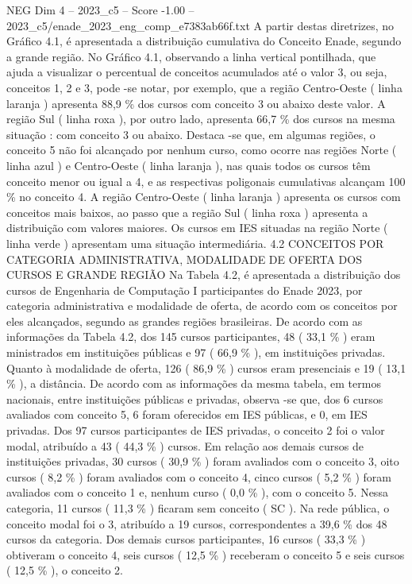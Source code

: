 \begin{textsample}{NEG Dim 4 – 2023\_c5 – Score -1.00 – 2023\_c5/enade\_2023\_eng\_comp\_e7383ab66f.txt}
A partir destas diretrizes, no Gráfico 4.1, é apresentada a distribuição cumulativa do Conceito Enade, segundo a grande região.
No Gráfico 4.1, observando a linha vertical pontilhada, que ajuda a visualizar o percentual de conceitos acumulados até o valor 3, ou seja, conceitos 1, 2 e 3, pode -se notar, por exemplo, que a região Centro-Oeste ( linha laranja ) apresenta 88,9 \% dos cursos com conceito 3 ou abaixo deste valor.
A região Sul ( linha roxa ), por outro lado, apresenta 66,7 \% dos cursos na mesma situação : com conceito 3 ou abaixo.
Destaca -se que, em algumas regiões, o conceito 5 não foi alcançado por nenhum curso, como ocorre nas regiões Norte ( linha azul ) e Centro-Oeste ( linha laranja ), nas quais todos os cursos têm conceito menor ou igual a 4, e as respectivas poligonais cumulativas alcançam 100 \% no conceito 4.
A região Centro-Oeste ( linha laranja ) apresenta os cursos com conceitos mais baixos, ao passo que a região Sul ( linha roxa ) apresenta a distribuição com valores maiores.
Os cursos em IES situadas na região Norte ( linha verde ) apresentam uma situação intermediária. 4.2 CONCEITOS POR CATEGORIA ADMINISTRATIVA, MODALIDADE DE OFERTA DOS CURSOS E GRANDE REGIÃO Na Tabela 4.2, é apresentada a distribuição dos cursos de Engenharia de Computação I participantes do Enade 2023, por categoria administrativa e modalidade de oferta, de acordo com os conceitos por eles alcançados, segundo as grandes regiões brasileiras.
De acordo com as informações da Tabela 4.2, dos 145 cursos participantes, 48 ( 33,1 \% ) eram ministrados em instituições públicas e 97 ( 66,9 \% ), em instituições privadas.
Quanto à modalidade de oferta, 126 ( 86,9 \% ) cursos eram presenciais e 19 ( 13,1 \% ), a distância.
De acordo com as informações da mesma tabela, em termos nacionais, entre instituições públicas e privadas, observa -se que, dos 6 cursos avaliados com conceito 5, 6 foram oferecidos em IES públicas, e 0, em IES privadas.
Dos 97 cursos participantes de IES privadas, o conceito 2 foi o valor modal, atribuído a 43 ( 44,3 \% ) cursos.
Em relação aos demais cursos de instituições privadas, 30 cursos ( 30,9 \% ) foram avaliados com o conceito 3, oito cursos ( 8,2 \% ) foram avaliados com o conceito 4, cinco cursos ( 5,2 \% ) foram avaliados com o conceito 1 e, nenhum curso ( 0,0 \% ), com o conceito 5.
Nessa categoria, 11 cursos ( 11,3 \% ) ficaram sem conceito ( SC ).
Na rede pública, o conceito modal foi o 3, atribuído a 19 cursos, correspondentes a 39,6 \% dos 48 cursos da categoria.
Dos demais cursos participantes, 16 cursos ( 33,3 \% ) obtiveram o conceito 4, seis cursos ( 12,5 \% ) receberam o conceito 5 e seis cursos ( 12,5 \% ), o conceito 2.

\end{textsample}
